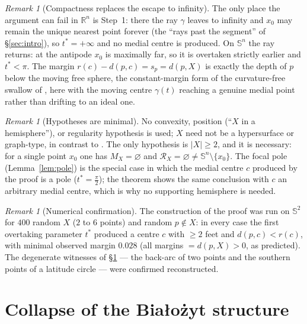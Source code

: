 \documentclass[11pt]{article}
\theoremstyle{remark}
\newtheorem{remark}[theorem]{Remark}
\newcommand{\R}{\mathbb{R}}
\newcommand{\X}{X}
\newcommand{\Mx}{M_{\X}}
\newcommand{\Rx}{\mathcal{R}_{\X}}
\newcommand{\Sn}{\mathbb{S}^{n}}
\begin{document}
\begin{remark}[Compactness replaces the escape to infinity]\label{rem:escape}
The only place the argument can fail in $\R^{n}$ is Step~1: there the ray
$\gamma$ leaves to infinity and $x_{0}$ may remain the unique nearest
point forever (the ``rays past the segment'' of \S\ref{sec:intro}), so
$t^{\ast}=+\infty$ and no medial centre is produced. On $\Sn$ the ray
returns: at the antipode $x_{0}$ is maximally far, so it is overtaken
strictly earlier and $t^{\ast}<\pi$. The margin
$r(c)-d(p,c)=s_{p}=d(p,\X)$ is exactly the depth of $p$ below the moving
free sphere, the constant-margin form of the curvature-free swallow of
\cite[Lem.~5.5]{R3}, here with the moving centre $\gamma(t)$ reaching a
genuine medial point rather than drifting to an ideal one.
\end{remark}

\begin{remark}[Hypotheses are minimal]\label{rem:minimal}
No convexity, position (``$\X$ in a hemisphere''), or regularity
hypothesis is used; $\X$ need not be a hypersurface or graph-type, in
contrast to \cite{R1,R2,R3}. The only hypothesis is $|\X|\ge2$, and it is
necessary: for a single point $x_{0}$ one has $\Mx=\varnothing$ and
$\Rx=\varnothing\neq\Sn\setminus\{x_{0}\}$. The focal pole
(Lemma~\ref{lem:pole}) is the special case in which the medial centre
$c$ produced by the proof is a pole ($t^{\ast}=\tfrac\pi2$); the theorem
shows the same conclusion with $c$ an arbitrary medial centre, which is
why no supporting hemisphere is needed.
\end{remark}

\begin{remark}[Numerical confirmation]\label{rem:numerics}
The construction of the proof was run on $\mathbb{S}^{2}$ for $400$ random
$\X$ ($2$ to $6$ points) and random $p\notin\X$: in every case the first
overtaking parameter $t^{\ast}$ produced a centre $c$ with $\ge2$ feet and
$d(p,c)<r(c)$, with minimal observed margin $0.028$ (all margins
$=d(p,\X)>0$, as predicted). The degenerate witnesses of
\S\ref{sec:collapse} --- the back-arc of two points and the southern
points of a latitude circle --- were confirmed reconstructed.
\end{remark}

\section{Collapse of the Bia\l{}o\.zyt structure}\label{sec:collapse}
\end{document}
